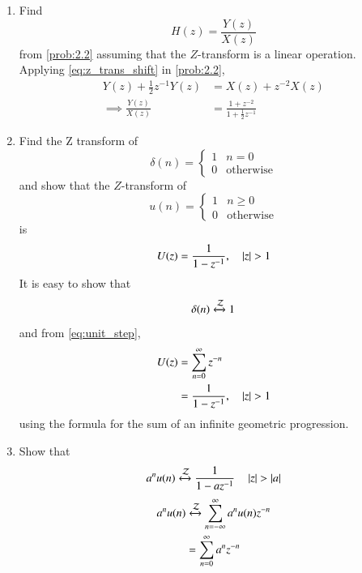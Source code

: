 \documentclass[journal,12pt,twocolumn]{IEEEtran}
\theoremstyle{remark}
\begin{document}
\begin{enumerate}[label=\thesection.\arabic*,ref=\thesection.\theenumi]
\item Find
%
\begin{equation}
H(z) = \frac{Y(z)}{X(z)}
\end{equation}
from  \eqref{prob:2.2} assuming that the $Z$-transform is a linear operation.
\\
\solution  Applying \eqref{eq:z_trans_shift} in \eqref{prob:2.2},
\begin{align}
Y(z) + \frac{1}{2}z^{-1}Y(z) &= X(z)+z^{-2}X(z)
\\
\implies \frac{Y(z)}{X(z)} &= \frac{1 + z^{-2}}{1 + \frac{1}{2}z^{-1}}
\label{eq:freq_resp}
\end{align}
%
\item Find the Z transform of 
\begin{equation}
\delta(n)
=
\begin{cases}
1 & n = 0
\\
0 & \text{otherwise}
\end{cases}
\end{equation}
and show that the $Z$-transform of
\begin{equation}
\label{eq:unit_step}
u(n)
=
\begin{cases}
1 & n \ge 0
\\
0 & \text{otherwise}
\end{cases}
\end{equation}
is
\begin{equation}
U(z) = \frac{1}{1-z^{-1}}, \quad \left\vert z\right\vert > 1
\end{equation}
\solution It is easy to show that
\begin{equation}
\delta(n) \xleftrightarrow{\mathcal{Z}} 1
\end{equation}
and from \eqref{eq:unit_step},
\begin{align}
U(z) &= \sum _{n= 0}^{\infty}z^{-n}
\\
&=\frac{1}{1-z^{-1}}, \quad \left\vert z\right\vert > 1
\end{align}
using the formula for the sum of an infinite geometric progression.
%
\item Show that   
\begin{equation}
\label{eq:anun}
a^nu(n) \xleftrightarrow{\mathcal{Z}} \frac{1}{1-az^{-1}} \quad \left\vert z\right\vert > \left\vert a\right\vert
\end{equation}
\solution 
\begin{align}
	a^nu(n) & \xleftrightarrow{\mathcal{Z}} \sum_{n = -\infty}^{\infty}a^nu(n)z^{-n} \\
 &=\sum_{n = 0}^{\infty}a^nz^{-n}\\

\end{align}
\end{enumerate}
\end{document}
